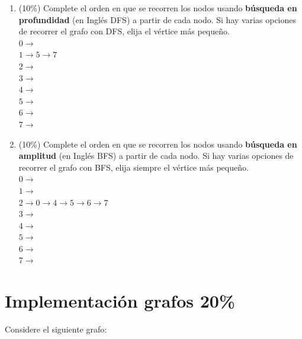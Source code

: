 \documentclass[twocolumn]{article}
\begin{document}
\begin{enumerate}[label=\Alph*]
  \item (10\%) Complete el orden en que se recorren los nodos usando \textbf{búsqueda en profundidad} (en Inglés DFS) a partir de cada nodo. Si hay varias opciones de recorrer el grafo con DFS, elija el vértice más pequeño.\\


$0 \rightarrow$\\
$1 \rightarrow 5 \rightarrow  7$\\
$2 \rightarrow$\\
$3 \rightarrow$\\
$4 \rightarrow$\\
$5 \rightarrow$\\
$6 \rightarrow$\\
$7 \rightarrow$\\


\item (10\%) Complete el orden en que se recorren los nodos usando \textbf{búsqueda en amplitud} (en Inglés BFS) a partir de cada nodo. Si hay varias opciones de recorrer el grafo con BFS, elija siempre el vértice más pequeño.\\


$0 \rightarrow$\\
$1 \rightarrow$\\
$2 \rightarrow 0 \rightarrow 4 \rightarrow 5 \rightarrow 6 \rightarrow 7$\\
$3 \rightarrow$\\
$4 \rightarrow$\\
$5 \rightarrow$\\
$6 \rightarrow$\\
$7 \rightarrow$\\


\end{enumerate}



\section{Implementación grafos 20\%}
Considere el siguiente grafo:
\end{document}
